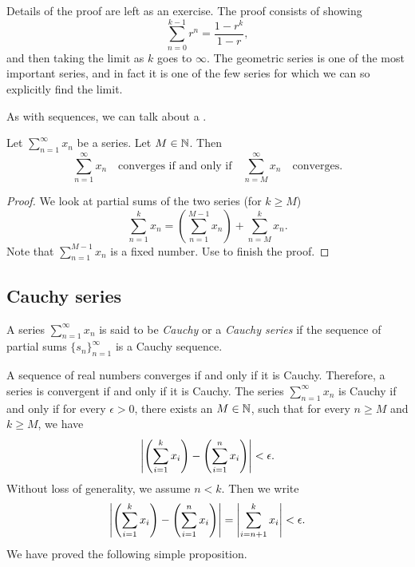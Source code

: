 Details of the proof are left as an exercise.
The proof consists of showing 
\begin{equation*}
\sum_{n=0}^{k-1} r^n = \frac{1-r^k}{1-r} ,
\end{equation*}
and then taking the limit as $k$ goes to $\infty$.
The geometric series is one of the most important series, and in fact it is
one of the few series for which we can so explicitly find the limit.

\medskip

\pagebreak[2]
As with sequences, we can talk about a \emph{}.

\begin{prop}
Let $\sum_{n=1}^\infty x_n$ be a series.  Let $M \in {\mathbb{N}}$.  Then
\begin{equation*}
\sum_{n=1}^\infty x_n \quad \text{converges if and only if} \quad
\sum_{n=M}^\infty x_n \quad \text{converges.}
\end{equation*}
\end{prop}

\begin{proof}
We look at partial sums of the two series (for $k \geq M$)
\begin{equation*}
\sum_{n=1}^{k} x_n
=
\left(
\sum_{n=1}^{M-1} x_n
\right)
+
\sum_{n=M}^{k} x_n .
\end{equation*}
Note that 
$\sum_{n=1}^{M-1} x_n$ is a fixed number.  Use
 to finish the proof.
\end{proof}

\subsection{Cauchy series}

\begin{defn}
A series $\sum_{n=1}^\infty x_n$ is said to be \emph{Cauchy} or a
\emph{Cauchy series}
if the sequence of partial sums $\{ s_n \}_{n=1}^\infty$ is a Cauchy sequence.
\end{defn}

A sequence of real numbers converges if and only if it is
Cauchy.  Therefore, a series is convergent if and only if it is Cauchy.
The series $\sum_{n=1}^\infty x_n$ is Cauchy if and only if for every $\epsilon > 0$,
there exists an $M \in {\mathbb{N}}$, such that for every $n \geq M$
and $k \geq M$, we have
\begin{equation*}
\left\lvert { \left( \sum_{i=1}^k x_i \right) - \left( \sum_{i=1}^n x_i \right) } \right\rvert
< \epsilon .
\end{equation*}
Without loss of generality, we assume $n < k$.  Then we write
\begin{equation*}
\left\lvert { \left( \sum_{i=1}^k x_i \right) - \left( \sum_{i=1}^n x_i \right) } \right\rvert
=
\left\lvert { \sum_{i={n+1}}^k x_i } \right\rvert
< \epsilon .
\end{equation*}
We have proved the following simple proposition.

